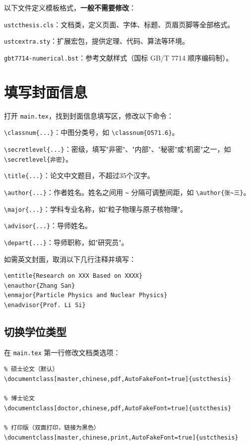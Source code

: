 以下文件定义模板格式，\textbf{一般不需要修改}：

\begin{compactitem}
    \item \texttt{ustcthesis.cls}：文档类，定义页面、字体、标题、页眉页脚等全部格式。
    \item \texttt{ustcextra.sty}：扩展宏包，提供定理、代码、算法等环境。
    \item \texttt{gbt7714-numerical.bst}：参考文献样式（国标 GB/T 7714 顺序编码制）。
\end{compactitem}

\section{填写封面信息}

打开 \texttt{main.tex}，找到封面信息填写区，修改以下命令：

\begin{compactitem}
    \item \verb|\classnum{...}|：中图分类号，如 \verb|\classnum{O571.6}|。
    \item \verb|\secretlevel{...}|：密级，填写"非密"、"内部"、"秘密"或"机密"之一，如 \verb|\secretlevel{非密}|。
    \item \verb|\title{...}|：论文中文题目，不超过35个汉字。
    \item \verb|\author{...}|：作者姓名。姓名之间用 \verb|~| 分隔可调整间距，如 \verb|\author{张~三}|。
    \item \verb|\major{...}|：学科专业名称，如"粒子物理与原子核物理"。
    \item \verb|\advisor{...}|：导师姓名。
    \item \verb|\depart{...}|：导师职称，如"研究员"。
\end{compactitem}

如需英文封面，取消以下几行注释并填写：
\begin{verbatim}
\entitle{Research on XXX Based on XXXX}
\enauthor{Zhang San}
\enmajor{Particle Physics and Nuclear Physics}
\enadvisor{Prof. Li Si}
\end{verbatim}

\subsection{切换学位类型}

在 \texttt{main.tex} 第一行修改文档类选项：

\begin{verbatim}
% 硕士论文（默认）
\documentclass[master,chinese,pdf,AutoFakeFont=true]{ustcthesis}

% 博士论文
\documentclass[doctor,chinese,pdf,AutoFakeFont=true]{ustcthesis}

% 打印版（双面打印，链接为黑色）
\documentclass[master,chinese,print,AutoFakeFont=true]{ustcthesis}
\end{verbatim}

